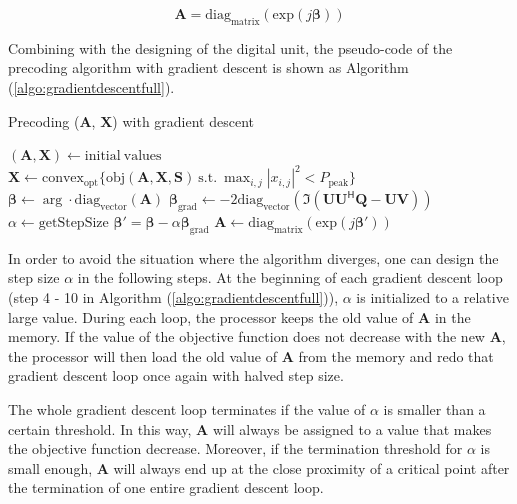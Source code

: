 \documentclass[12pt,draftclsnofoot,onecolumn,journal]{IEEEtran}
\begin{document}
\begin{equation}
\mathbf A=\mathrm{diag_{matrix}}\left(\mathrm{exp}({j\boldsymbol \beta})\right)
\label{eq:irsphaseinversetransformation}
\end{equation}

Combining with the designing of the digital unit, the pseudo-code of the precoding algorithm with gradient descent is shown as Algorithm (\ref{algo:gradientdescentfull}).
\begin{algorithm}
\caption{Precoding ($\mathbf{A}$, $\mathbf{X}$) with gradient descent}
\begin{algorithmic}[1]
\State $ (\mathbf{A}, \mathbf{X}) \gets \mathrm{initial\ values} $
\State $\mathbf{X}\gets\mathrm{convex_{opt}}\{\mathrm{obj}(\mathbf A, \mathbf X, \mathbf S)\ \mathrm{s.t.}\ \max_{i,j} |x_{i,j}|^2<P_{\mathrm{peak}}\}$
	\State $\boldsymbol \beta \gets \arg \cdot \mathrm{diag_{vector}}(\mathbf A)$
	\State $\boldsymbol \beta_\mathrm{grad}\gets -2\mathrm{diag_{vector}}(\Im(\mathbf{UU^{\mathsf H}Q}-\mathbf{UV}))$
	\State $\alpha \gets \mathrm{getStepSize}$
	\State $\boldsymbol \beta'=\boldsymbol \beta-\alpha \boldsymbol \beta_\mathrm{grad}$
	\State $\mathbf A\gets \mathrm{diag_{matrix}}\left(\mathrm{exp}({j\boldsymbol \beta'})\right)$
\EndWhile
\EndWhile
\end{algorithmic}
\label{algo:gradientdescentfull}
\end{algorithm}

In order to avoid the situation where the algorithm diverges, one can design the step size $\alpha$ in the following steps. At the beginning of each gradient descent loop (step 4 - 10 in Algorithm (\ref{algo:gradientdescentfull})), $\alpha$ is initialized to a relative large value. During each loop, the processor keeps the old value of $\mathbf A$ in the memory. If the value of the objective function does not decrease with the new $\mathbf A$, the processor will then load the old value of $\mathbf A$ from the memory and redo that gradient descent loop once again with halved step size. 

The whole gradient descent loop terminates if the value of $\alpha$ is smaller than a certain threshold. In this way, $\mathbf A$ will always be assigned to a value that makes the objective function decrease. Moreover, if the termination threshold for $\alpha$ is small enough, $\mathbf A$ will always end up at the close proximity of a critical point after the termination of one entire gradient descent loop. 
\end{document}
